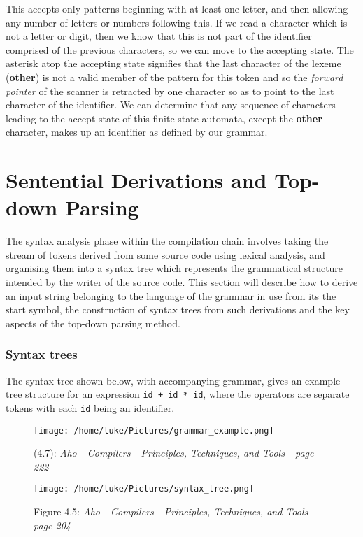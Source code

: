 \documentclass[a4paper, 11pt]{article}
\begin{document}
\noindent This accepts only patterns beginning with at least one letter, and then allowing any number of letters or numbers following this. If we read a character which is not a letter or digit, then we know that this is not part of the identifier comprised of the previous characters, so we can move to the accepting state. The asterisk atop the accepting state signifies that the last character of the lexeme (\textbf{other}) is not a valid member of the pattern for this token and so the \textit{forward pointer} of the scanner is retracted by one character so as to point to the last character of the identifier. We can determine that any sequence of characters leading to the accept state of this finite-state automata, except the \textbf{other} character, makes up an identifier as defined by our grammar.


\clearpage
\section{Sentential Derivations and Top-down Parsing}
The syntax analysis phase within the compilation chain involves taking the stream of tokens derived from some source code using lexical analysis, and organising them into a syntax tree which represents the grammatical structure intended by the writer of the source code. This section will describe how to derive an input string belonging to the language of the grammar in use from its the start symbol, the construction of syntax trees from such derivations and the key aspects of the top-down parsing method.

\subsubsection{Syntax trees}
The syntax tree shown below, with accompanying grammar, gives an example tree structure for an expression \texttt{id + id * id}, where the operators are separate tokens with each \texttt{id} being an identifier.

\begin{figure}[ht!]
	\centering
	\texttt{[image: /home/luke/Pictures/grammar\_example.png]}
	{\caption*{(4.7): \textit{Aho - Compilers - Principles, Techniques, and Tools - page 222}} \label{overflow}}
\end{figure}

\begin{figure}[ht!]
	\centering
	\texttt{[image: /home/luke/Pictures/syntax\_tree.png]}
	{\caption*{Figure 4.5: \textit{Aho - Compilers - Principles, Techniques, and Tools - page 204}} 
	\label{overflow}}
\end{figure}
\end{document}
